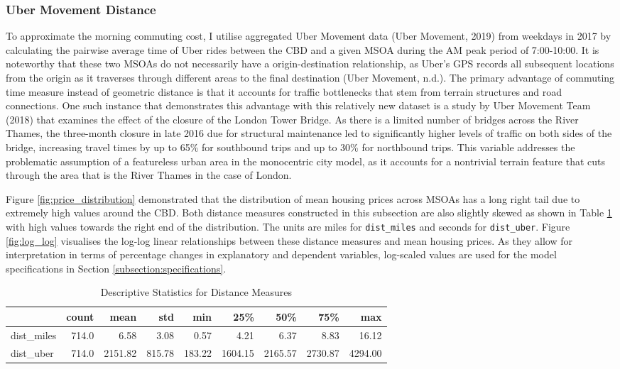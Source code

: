 \documentclass{article}
\begin{document}
\subsubsection{Uber Movement Distance}
To approximate the morning commuting cost, I utilise aggregated Uber Movement data (Uber Movement, 2019) from weekdays in 2017 by calculating the pairwise average time of Uber rides between the CBD and a given MSOA during the AM peak period of 7:00-10:00. It is noteworthy that these two MSOAs do not necessarily have a origin-destination relationship, as Uber's GPS records all subsequent locations from the origin as it traverses through different areas to the final destination (Uber Movement, n.d.). The primary advantage of commuting time measure instead of geometric distance is that it accounts for traffic bottlenecks that stem from terrain structures and road connections. One such instance that demonstrates this advantage with this relatively new dataset is a study by Uber Movement Team (2018) that examines the effect of the closure of the London Tower Bridge. As there is a limited number of bridges across the River Thames, the three-month closure in late 2016 due for structural maintenance led to significantly higher levels of traffic on both sides of the bridge, increasing travel times by up to 65\% for southbound trips and up to 30\% for northbound trips. This variable addresses the problematic assumption of a featureless urban area in the monocentric city model, as it accounts for a nontrivial terrain feature that cuts through the area that is the River Thames in the case of London. 

Figure \ref{fig:price_distribution} demonstrated that the distribution of mean housing prices across MSOAs has a long right tail due to extremely high values around the CBD. Both distance measures constructed in this subsection are also slightly skewed as shown in Table \ref{table:distance} with high values towards the right end of the distribution. The units are miles for \texttt{dist\_miles} and seconds for \texttt{dist\_uber}. Figure \ref{fig:log_log} visualises the log-log linear relationships between these distance measures and mean housing prices. As they allow for interpretation in terms of percentage changes in explanatory and dependent variables, log-scaled values are used for the model specifications in Section \ref{subsection:specifications}.

\begin{table}[H]
\centering
\caption{Descriptive Statistics for Distance Measures} 
  \label{table:distance} 
\begin{tabular}{lrrrrrrrr}
\toprule
{} &  count &     mean &     std &     min &      25\% &      50\% &      75\% &      max \\
\midrule
dist\_miles     &  714.0 &     6.58 &    3.08 &    0.57 &     4.21 &     6.37 &     8.83 &    16.12 \\
dist\_uber &  714.0 &  2151.82 &  815.78 &  183.22 &  1604.15 &  2165.57 &  2730.87 &  4294.00 \\
\bottomrule
\end{tabular}
\end{table}
\end{document}
